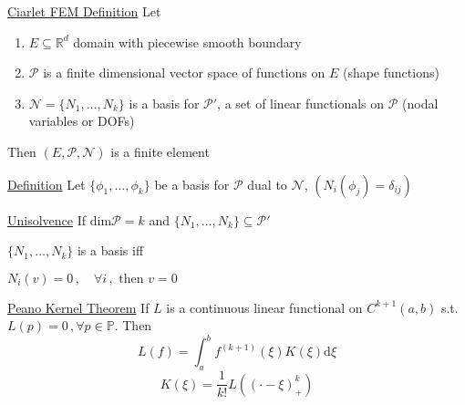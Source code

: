 \documentclass[letterpaper]{article}
\def\d{\mathrm{d}}
\begin{document}
\begin{multicols}{2}
\uline{Ciarlet FEM Definition} Let
\begin{enumerate}
\item $E\subseteq\mathbb{R}^d$ domain with piecewise smooth boundary
\item $\mathcal{P}$ is a finite dimensional vector space of functions on $E$
(shape functions)
\item $\mathcal{N}=\{N_1,\dots,N_k\}$ is a basis for $\mathcal{P}'$, a set of
linear functionals on $\mathcal{P}$ (nodal variables or DOFs)
\end{enumerate}
Then $(E,\mathcal{P},\mathcal{N})$ is a finite element

\uline{Definition} Let $\{\phi_1,\dots,\phi_k\}$ be a basis for $\mathcal{P}$
dual to $\mathcal{N}$, $(N_i(\phi_j)=\delta_{ij})$

\uline{Unisolvence} If $\mathrm{dim}\mathcal{P}=k$ and
$\{N_1,\dots,N_k\}\subseteq\mathcal{P}'$

$\{N_1,\dots,N_k\}$ is a basis iff

$N_i(v)=0\,,\quad\forall i\,,\text{ then }v=0$

\uline{Peano Kernel Theorem}
If $L$ is a continuous linear functional on $C^{k+1}(a,b)$ s.t.
$L(p)=0\,,\forall p\in\mathbb{P}$. Then
\[
L(f)=\int_a^b f^{(k+1)}(\xi)K(\xi)\d\xi
\]
\[
K(\xi)=\frac{1}{k!}L\left( (\cdot-\xi)^k_+ \right)
\]


\end{multicols}
\end{document}
